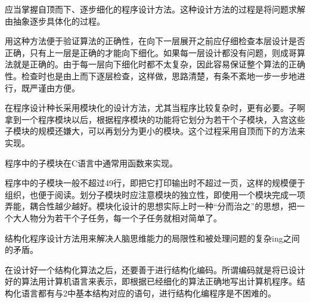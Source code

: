 应当掌握自顶而下、逐步细化的程序设计方法。这种设计方法的过程是将问题求解由抽象逐步具体化的过程。

用这种方法便于验证算法的正确性，在向下一层展开之前应仔细检查本层设计是否正确，只有上一层是正确的才能向下细化。如果每一层设计都没有问题，则成哥算法就是正确的。由于每一层向下细化时都不太复杂，因此容易保证整个算法的正确性。检查时也是由上而下逐层检查，这样做，思路清楚，有条不紊地一步一步地进行，既严谨由方便。

在程序设计种长采用模块化的设计方法，尤其当程序比较复杂时，更有必要。子啊拿到一个程序模块以后，根据程序模块的功能将它划分为若干个子模块，入宫这些子模块的规模还嫌大，可以再划分为更小的模块。这个过程采用自顶而下的方法来实现。

程序中的子模块在C语言中通常用函数来实现。

程序中的子模块一般不超过49行，即把它打印输出时不超过一页，这样的规模便于组织，也便于阅读。划分子模块时应注意模块的独立性，即使用一个模块完成一项弄能，耦合性越少越好。模块化设计的思想实际上时一种“分而治之”的思想，把一个大人物分为若干个子任务，每一个子任务就相对简单了。

结构化程序设计方法用来解决人脑思维能力的局限性和被处理问题的复杂ing之间的矛盾。

在设计好一个结构化算法之后，还要善于进行结构化编码。所谓编码就是将已设计好的算法用计算机语言来表示，即根据已经细化的算法正确地写出计算机程序。结构化语言都有与2中基本结构对应的语句，进行结构化编程序是不困难的。

